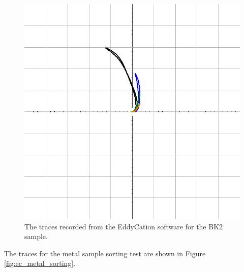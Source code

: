 \documentclass[12 pt]{report}
\begin{document}
\begin{figure}[htbp]
	\centering
	\includegraphics[width=6in]{images/graphs/eddy current testing/S4G2BK2}
	\caption{The traces recorded from the EddyCation software for the BK2 sample.}
	\label{fig:ec_bk2}
\end{figure}

The traces for the metal sample sorting test are shown in Figure \ref{fig:ec_metal_sorting}.
\end{document}
